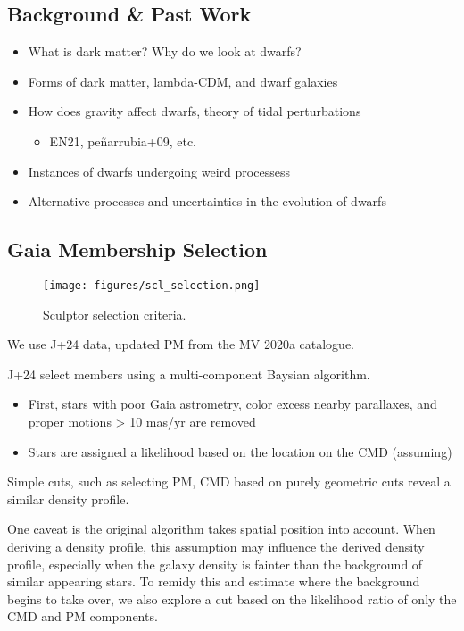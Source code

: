 \subsection{Background \& Past Work}\label{background-past-work}

\begin{itemize}
\tightlist
\item
  What is dark matter? Why do we look at dwarfs?
\item
  Forms of dark matter, lambda-CDM, and dwarf galaxies
\item
  How does gravity affect dwarfs, theory of tidal perturbations

  \begin{itemize}
  \tightlist
  \item
    EN21, peñarrubia+09, etc.
  \end{itemize}
\item
  Instances of dwarfs undergoing weird processess
\item
  Alternative processes and uncertainties in the evolution of dwarfs
\end{itemize}

\subsection{Gaia Membership Selection}\label{gaia-membership-selection}

\begin{figure}
\centering
\texttt{[image: figures/scl\_selection.png]}
\caption{Sculptor selection criteria.}\label{fig:sculptor_selection}
\end{figure}

We use J+24 data, updated PM from the MV 2020a catalogue.

J+24 select members using a multi-component Baysian algorithm.

\begin{itemize}
\tightlist
\item
  First, stars with poor Gaia astrometry, color excess nearby
  parallaxes, and proper motions \textgreater{} 10 mas/yr are removed
\item
  Stars are assigned a likelihood based on the location on the CMD
  (assuming)
\end{itemize}

Simple cuts, such as selecting PM, CMD based on purely geometric cuts
reveal a similar density profile.

One caveat is the original algorithm takes spatial position into
account. When deriving a density profile, this assumption may influence
the derived density profile, especially when the galaxy density is
fainter than the background of similar appearing stars. To remidy this
and estimate where the background begins to take over, we also explore a
cut based on the likelihood ratio of only the CMD and PM components.

